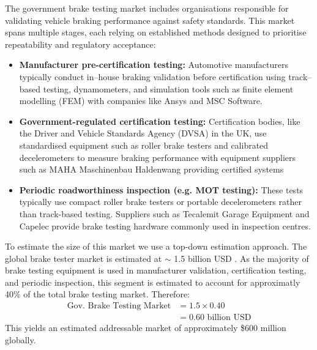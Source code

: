 The government brake testing market includes organisations responsible for validating vehicle braking performance against safety standards. This market spans multiple stages, each relying on established methods designed to prioritise repeatability and regulatory acceptance:

\begin{itemize}
    \item \textbf{Manufacturer pre-certification testing:} Automotive manufacturers typically conduct in--house braking validation before certification using track--based testing, dynamometers, and simulation tools such as finite element modelling (FEM) with companies like Ansys and MSC Software.
    
    \item \textbf{Government-regulated certification testing:} Certification bodies, like the Driver and Vehicle Standards Agency (DVSA) in the UK, use standardised equipment such as roller brake testers and calibrated decelerometers to measure braking performance with equipment suppliers such as MAHA Maschinenbau Haldenwang providing certified systems
    
    \item \textbf{Periodic roadworthiness inspection (e.g. MOT testing):} These tests typically use compact roller brake testers or portable decelerometers rather than track-based testing. Suppliers such as Tecalemit Garage Equipment and Capelec provide brake testing hardware commonly used in inspection centres. 
\end{itemize}

To estimate the size of this market we use a top-down estimation approach. The global brake tester market is estimated at $\sim$ 1.5 billion USD {\cite{promarketreports_brake_tester}}. As the majority of brake testing equipment is used in manufacturer validation, certification testing, and periodic inspection, this segment is estimated to account for approximatly 40\% of the total brake testing market. Therefore:
\begin{equation}
\begin{aligned}
\text{Gov. Brake Testing Market} &= 1.5 \times 0.40 \\
&= 0.60 \text{ billion USD}
\end{aligned}
\end{equation}
\vspace{+6pt}
This yields an estimated addressable market of approximately \$600 million globally.
\vspace{-10pt}
